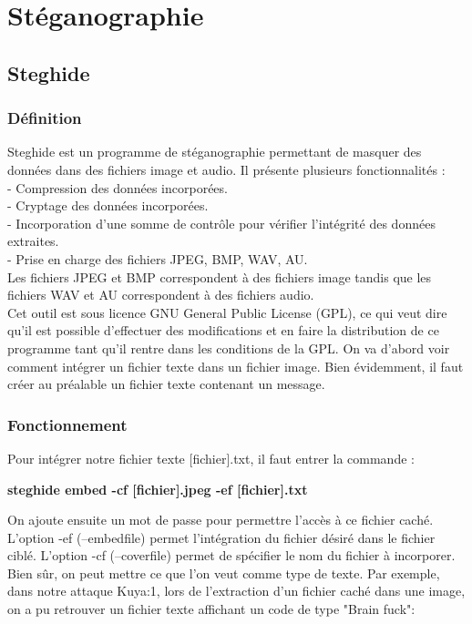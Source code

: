 \chapter{Stéganographie}
\label{chap:BDD}

\section{Steghide}
\subsection{Définition}

Steghide est un programme de stéganographie permettant de masquer des données dans des fichiers image et audio. Il présente plusieurs fonctionnalités :\\
-        Compression des données incorporées.\\
-        Cryptage des données incorporées.\\
-        Incorporation d’une somme de contrôle pour vérifier l’intégrité des données extraites.\\
-        Prise en charge des fichiers JPEG, BMP, WAV, AU.\\
Les fichiers JPEG et BMP correspondent à des fichiers image tandis que les fichiers WAV et AU correspondent à des fichiers audio. \\
Cet outil est sous licence GNU General Public License (GPL), ce qui veut dire qu’il est possible d’effectuer des modifications et en faire la distribution de ce programme tant qu’il rentre dans les conditions de la GPL.
On va d’abord voir comment intégrer un fichier texte dans un fichier image. Bien évidemment, il faut créer au préalable un fichier texte contenant un message.

\subsection{Fonctionnement}

Pour intégrer notre fichier texte [fichier].txt, il faut entrer la commande :

\begin{center}
    \textbf{steghide embed -cf [fichier].jpeg -ef [fichier].txt}
\end{center}

On ajoute ensuite un mot de passe pour permettre l’accès à ce fichier caché. L’option -ef (--embedfile) permet l’intégration du fichier désiré dans le fichier ciblé. L’option -cf (--coverfile) permet de spécifier le nom du fichier à incorporer.\\ 
Bien sûr, on peut mettre ce que l'on veut comme type de texte. Par exemple, dans notre attaque Kuya:1, lors de l'extraction d'un fichier caché dans une image, on a pu retrouver un fichier texte affichant un code de type "Brain fuck":\\


